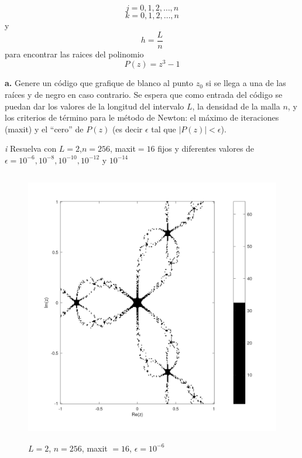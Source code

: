 \documentclass{article} %
\begin{document}
\begin{equation*}
    j = 0,1,2,\ldots,n
\end{equation*}
\begin{equation*}
    k = 0,1,2,\ldots,n
\end{equation*}
y
\begin{equation*}
    h = \frac{L}{n}
\end{equation*}
para encontrar las raices del polinomio
\begin{equation*}
    P(z) = z^3 -1
\end{equation*}

\textbf{a.} Genere un código que grafique de blanco al punto $z_0$ si se llega a una de las raíces y de negro en caso contrario. Se espera que como entrada del código se puedan dar los valores de la longitud del intervalo $L$, la densidad de la malla $n$, y los criterios de término para le método de Newton: el máximo de iteraciones (maxit) y el ``cero'' de $P(z)$ (es decir $\epsilon$ tal que $|P(z)| < \epsilon$).

\textit{i} Resuelva con $L=2$,$n=256$, maxit$=16$ fijos y diferentes valores de $\epsilon = 10^{-6},10^{-8},10^{-10},10^{-12}$ y $10^{-14}$

\begin{figure}[H]
    \centering
    \includegraphics[width=152mm, height=120mm]{images/L2n256maxit16e10-6.png}
    \caption{$L=2$, $n=256$, maxit $=16$, $\epsilon=10^{-6}$}
\end{figure}
\end{document}
